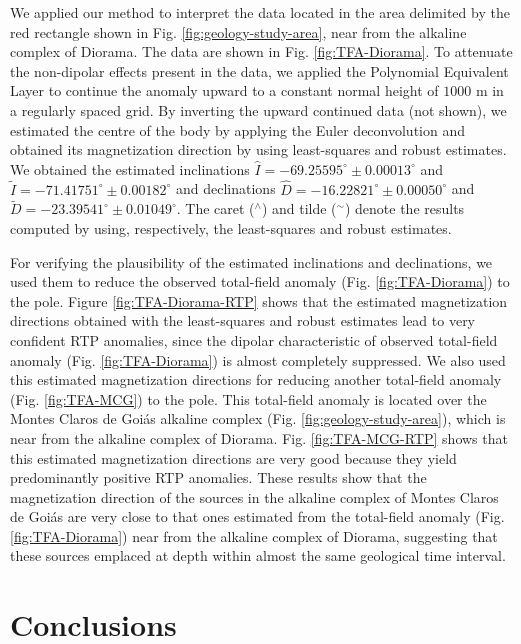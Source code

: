 \documentclass[journal abbreviation, npg]{copernicus}
\begin{document}
We applied our method to interpret the data located in the area delimited by the red rectangle shown in Fig. \ref{fig:geology-study-area}, near from the alkaline complex of Diorama. The data are shown in Fig. \ref{fig:TFA-Diorama}. To attenuate the non-dipolar effects present in the data, we applied the Polynomial Equivalent Layer \citep{oliveirajr-etal2013} to continue the anomaly upward to a constant normal height of $1000$ m in a regularly spaced grid. By inverting the upward continued data (not shown), we estimated the centre of the body by applying the Euler deconvolution and obtained its magnetization direction by using least-squares and robust estimates. We obtained the estimated inclinations $\hat{I} = -69.25595^{\circ} \pm 0.00013^{\circ}$ and $\tilde{I} = -71.41751^{\circ} \pm 0.00182^{\circ}$ and declinations $\hat{D} = -16.22821^{\circ} \pm 0.00050^{\circ}$ and $\tilde{D} = -23.39541^{\circ} \pm 0.01049^{\circ}$. The caret ($^{\wedge}$) and tilde ($^{\sim}$) denote the results computed by using, respectively, the least-squares and robust estimates.

For verifying the plausibility of the estimated inclinations and declinations, we used them to reduce the observed total-field anomaly (Fig. \ref{fig:TFA-Diorama}) to the pole. Figure \ref{fig:TFA-Diorama-RTP} shows that the estimated magnetization directions obtained with the least-squares and robust estimates lead to very confident RTP anomalies, since the dipolar characteristic of observed total-field anomaly (Fig. \ref{fig:TFA-Diorama}) is almost completely suppressed. We also used this estimated magnetization directions for reducing another total-field anomaly (Fig. \ref{fig:TFA-MCG}) to the pole. This total-field anomaly is located over the Montes Claros de Goiás alkaline complex (Fig. \ref{fig:geology-study-area}), which is near from the alkaline complex of Diorama. Fig. \ref{fig:TFA-MCG-RTP} shows that this estimated magnetization directions are very good because they yield predominantly positive RTP anomalies. These results show that the magnetization direction of the sources in the alkaline complex of Montes Claros de Goiás are very close to that ones estimated from the total-field anomaly (Fig. \ref{fig:TFA-Diorama}) near from the alkaline complex of Diorama, suggesting that these sources emplaced at depth within almost the same geological time interval.

\section{Conclusions}
\end{document}

